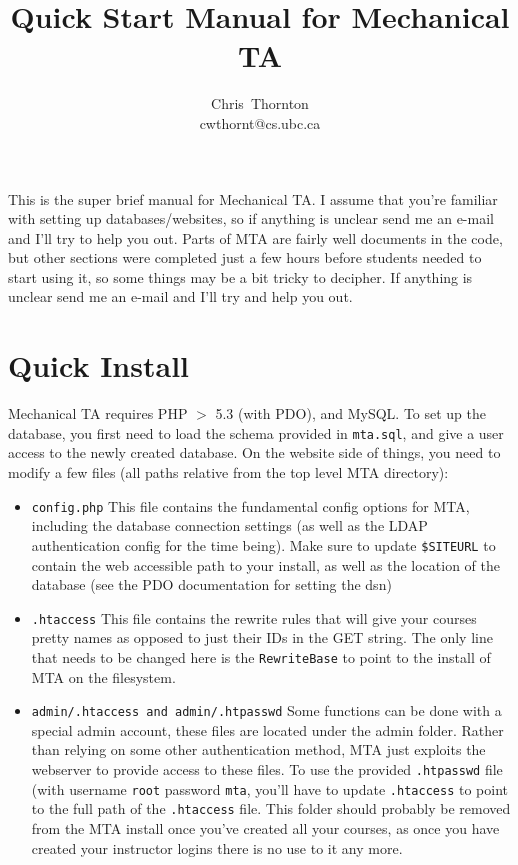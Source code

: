 \documentclass[11pt,letterpaper,oneside]{article}
\begin{document}
\title{Quick Start Manual for Mechanical TA}

\author{
Chris~Thornton\\
cwthornt@cs.ubc.ca
}

\maketitle

\tableofcontents

This is the super brief manual for Mechanical TA. I assume that you're familiar with setting up databases/websites, so if anything is unclear send me an e-mail and I'll try to help you out. Parts of MTA are fairly well documents in the code, but other sections were completed just a few hours before students needed to start using it, so some things may be a bit tricky to decipher. If anything is unclear send me an e-mail and I'll try and help you out.

\section{Quick Install}

Mechanical TA requires PHP $>$ 5.3 (with PDO), and MySQL. To set up the database, you first need to load the schema provided in \texttt{mta.sql}, and give a user access to the newly created database. On the website side of things, you need to modify a few files (all paths relative from the top level MTA directory):

\begin{itemize}
  \item \texttt{config.php} This file contains the fundamental config options for MTA, including the database connection settings (as well as the LDAP authentication config for the time being). Make sure to update \texttt{\$SITEURL} to contain the web accessible path to your install, as well as the location of the database (see the PDO documentation for setting the dsn)
  \item \texttt{.htaccess} This file contains the rewrite rules that will give your courses pretty names as opposed to just their IDs in the GET string. The only line that needs to be changed here is the \texttt{RewriteBase} to point to the install of MTA on the filesystem.
  \item \texttt{admin/.htaccess and admin/.htpasswd} Some functions can be done with a special admin account, these files are located under the admin folder. Rather than relying on some other authentication method, MTA just exploits the webserver to provide access to these files. To use the provided \texttt{.htpasswd} file (with username \texttt{root} password \texttt{mta},  you'll have to update \texttt{.htaccess} to point to the full path of the \texttt{.htaccess} file. This folder should probably be removed from the MTA install once you've created all your courses, as once you have created your instructor logins there is no use to it any more.
\end{itemize}
\end{document}
